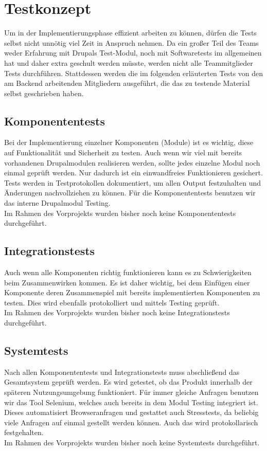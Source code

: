\documentclass{swp}
\begin{document}
\section{Testkonzept}
Um in der Implementierungsphase effizient arbeiten zu k\"onnen, d\"urfen die Tests selbst nicht unn\"otig viel Zeit in Anspruch nehmen. Da ein gro{\ss}er Teil des Teams weder Erfahrung mit Drupals Test-Modul, noch mit Softwaretests im allgemeinen hat und daher extra geschult werden m\"usste, werden nicht alle Teammitglieder Tests durchf\"uhren. Stattdessen werden die im folgenden erl\"auterten Tests von den am Backend arbeitenden Mitgliedern ausgef\"uhrt, die das zu testende Material selbst geschrieben haben.
\subsection{Komponententests}
Bei der Implementierung einzelner Komponenten (Module) ist es wichtig, diese auf Funktionalit\"at und Sicherheit zu testen. Auch wenn wir viel mit bereits vorhandenen Drupalmodulen realisieren werden, sollte jedes einzelne Modul noch einmal gepr\"uft werden. Nur dadurch ist ein einwandfreies Funktionieren gesichert. Tests werden in Testprotokollen dokumentiert, um allen Output festzuhalten und \"Anderungen nachvollziehen zu k\"onnen. F\"ur die Komponententests benutzen wir das interne Drupalmodul \glqq Testing\grqq{}. \\
Im Rahmen des Vorprojekts wurden bisher noch keine Komponententests durchgef\"uhrt.
\subsection{Integrationstests}
Auch wenn alle Komponenten richtig funktionieren kann es zu Schwierigkeiten beim Zusammenwirken kommen. Es ist daher wichtig, bei dem Einf\"ugen einer Komponente deren Zusammenspiel mit bereits implementierten Komponenten zu testen. Dies wird ebenfalls protokolliert und mittels \glqq Testing\grqq{} gepr\"uft.\\
Im Rahmen des Vorprojekts wurden bisher noch keine Integrationstests durchgef\"uhrt.
\subsection{Systemtests}
Nach allen Komponententests und Integrationstests muss abschlie{\ss}end das Gesamtsystem gepr\"uft werden. Es wird getestet, ob das Produkt innerhalb der sp\"ateren Nutzungsumgebung funktioniert. F\"ur immer gleiche Anfragen benutzen wir das Tool \glqq Selenium\grqq{}, welches auch bereits in dem Modul \glqq Testing\grqq{} integriert ist. Dieses automatisiert Browseranfragen und gestattet auch Stresstests, da beliebig viele Anfragen auf einmal gestellt werden k\"onnen. Auch das wird protokollarisch festgehalten.\\
Im Rahmen des Vorprojekts wurden bisher noch keine Systemtests durchgef\"uhrt.
\end{document}
